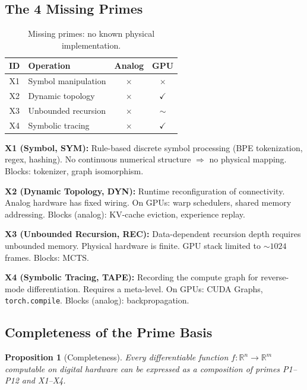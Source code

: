 \documentclass[11pt]{article}
\newtheorem{proposition}{Proposition}
\begin{document}
\subsection{The 4 Missing Primes}

\begin{table}[h]
\centering
\caption{Missing primes: no known physical implementation.}
\label{tab:missing}
\begin{tabular}{clcc}
\toprule
ID & Operation & Analog & GPU \\
\midrule
X1 & Symbol manipulation & $\times$ & $\times$ \\
X2 & Dynamic topology & $\times$ & $\checkmark$ \\
X3 & Unbounded recursion & $\times$ & $\sim$ \\
X4 & Symbolic tracing & $\times$ & $\checkmark$ \\
\bottomrule
\end{tabular}
\end{table}

\textbf{X1 (Symbol, SYM):} Rule-based discrete symbol processing (BPE tokenization, regex, hashing). No continuous numerical structure $\Rightarrow$ no physical mapping. Blocks: tokenizer, graph isomorphism.

\textbf{X2 (Dynamic Topology, DYN):} Runtime reconfiguration of connectivity. Analog hardware has fixed wiring. On GPUs: warp schedulers, shared memory addressing. Blocks (analog): KV-cache eviction, experience replay.

\textbf{X3 (Unbounded Recursion, REC):} Data-dependent recursion depth requires unbounded memory. Physical hardware is finite. GPU stack limited to ${\sim}1024$ frames. Blocks: MCTS.

\textbf{X4 (Symbolic Tracing, TAPE):} Recording the compute graph for reverse-mode differentiation. Requires a meta-level. On GPUs: CUDA Graphs, \texttt{torch.compile}. Blocks (analog): backpropagation.

\subsection{Completeness of the Prime Basis}
\label{sec:completeness}

\begin{proposition}[Completeness]
Every differentiable function $f: \mathbb{R}^n \to \mathbb{R}^m$ computable on digital hardware can be expressed as a composition of primes P1--P12 and X1--X4.
\end{proposition}
\end{document}

